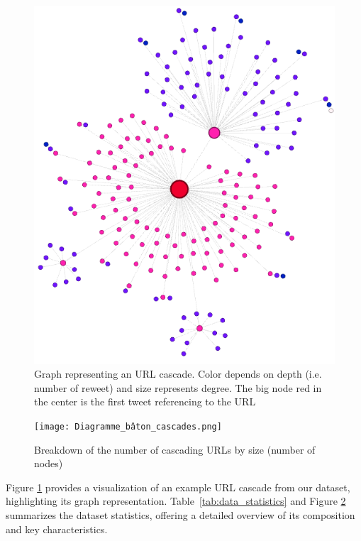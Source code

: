 \documentclass[sigconf,nonacm]{acmart}
\begin{document}
\begin{figure}
    \centering
    \includegraphics[scale=0.3]{graph_528_label_0_better_representation.png}
    \caption{Graph representing an URL cascade. Color depends on depth (i.e. number of reweet) and size represents degree. The big node red in the center is the first tweet referencing to the URL}
    \label{fig:url_cascade}
\end{figure}

\begin{figure}
    \centering
    \texttt{[image: Diagramme\_bâton\_cascades.png]}
    \caption{Breakdown of the number of cascading URLs by size (number of nodes)}
    \label{fig:graph_repartition}
\end{figure}

Figure \ref{fig:url_cascade} provides a visualization of an example URL cascade from our dataset, highlighting its graph representation. Table~\ref{tab:data_statistics} and Figure \ref{fig:graph_repartition} summarizes the dataset statistics, offering a detailed overview of its composition and key characteristics.
\end{document}
